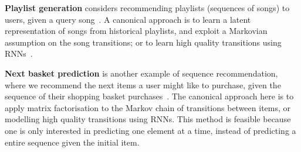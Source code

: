 %


%
{\bf Playlist generation}
considers recommending playlists (\ie sequences of songs) to users, given a query song~\citep{McFee:2011,chen2012playlist,hidasi2015session}.
A canonical approach is to
learn a latent representation of songs from historical playlists,
and exploit a Markovian assumption on the song transitions;
or to learn high quality transitions using RNNs~\cite{choi2016towards}.

%
{\bf Next basket prediction}
is another example of sequence recommendation,
where we recommend the next items a user might like to purchase, given the sequence of their shopping basket purchases~\citep{Rendle:2010,Wang:2015}.
The canonical approach here is to apply matrix factorisation to the Markov chain of transitions between items,
or modelling high quality transitions using RNNs.
This method is feasible because one is only interested in predicting %
one element at a time, instead of predicting a entire sequence given the initial item.




